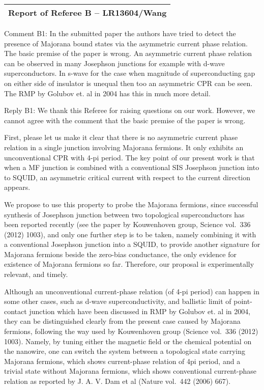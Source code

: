 \documentclass[11pt]{article}
\begin{document}
\begin{longtable}[]{@{}l@{}}
\toprule
\endhead
Report of Referee B -- LR13604/Wang\tabularnewline
\bottomrule
\end{longtable}

Comment B1: In the submitted paper the authors have tried to detect the
presence of Majorana bound states via the asymmetric current phase
relation. The basic premise of the paper is wrong. An asymmetric current
phase relation can be observed in many Josephson junctions for example
with d-wave superconductors. In s-wave for the case when magnitude of
superconducting gap on either side of insulator is unequal then too an
asymmetric CPR can be seen. The RMP by Golubov et. al in 2004 has this
in much more detail.

Reply B1: We thank this Referee for raising questions on our work.
However, we cannot agree with the comment that the basic premise of the
paper is wrong.

First, please let us make it clear that there is no asymmetric current
phase relation in a single junction involving Majorana fermions. It only
exhibits an unconventional CPR with 4-pi period. The key point of our
present work is that when a MF junction is combined with a conventional
SIS Josephson junction into to SQUID, an asymmetric critical current
with respect to the current direction appears.

We propose to use this property to probe the Majorana fermions, since
successful synthesis of Josephson junction between two topological
superconductors has been reported recently (see the paper by Kouwenhoven
group, Science vol.~336 (2012) 1003), and only one further step is to be
taken, namely combining it with a conventional Josephson junction into a
SQUID, to provide another signature for Majorana fermions beside the
zero-bias conductance, the only evidence for existence of Majorana
fermions so far. Therefore, our proposal is experimentally relevant, and
timely.

Although an unconventional current-phase relation (of 4-pi period) can
happen in some other cases, such as d-wave superconductivity, and
ballistic limit of point-contact junction which have been discussed in
RMP by Golubov et. al in 2004, they can be distinguished clearly from
the present case caused by Majorana fermions, following the way used by
Kouwenhoven group (Science vol.~336 (2012) 1003). Namely, by tuning
either the magnetic field or the chemical potential on the nanowire, one
can switch the system between a topological state carrying Majorana
fermions, which shows current-phase relation of 4pi period, and a
trivial state without Majorana fermions, which shows conventional
current-phase relation as reported by J. A. V. Dam et al (Nature
vol.~442 (2006) 667).
\end{document}

